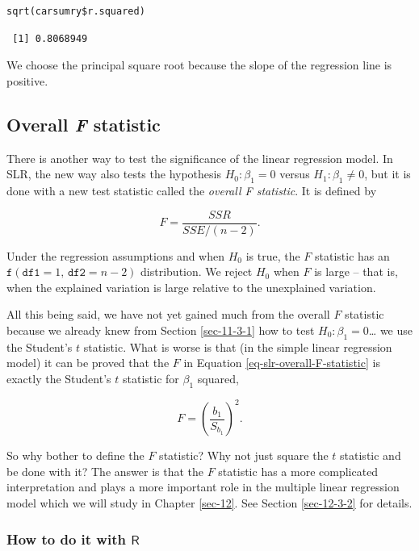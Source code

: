 \documentclass[captions=tableheading]{scrbook}
\begin{document}
\begin{verbatim}
sqrt(carsumry$r.squared)
\end{verbatim}

\begin{verbatim}
 [1] 0.8068949
\end{verbatim}

We choose the principal square root because the slope of the regression line is positive.
\subsection{Overall \emph{F} statistic}
\label{sec-11-3-3}
\label{sub-slr-overall-F-statistic}


There is another way to test the significance of the linear regression model. In SLR, the new way also tests the hypothesis \(H_{0}:\beta_{1}=0\) versus \(H_{1}:\beta_{1}\neq0\), but it is done with a new test statistic called the \emph{overall F statistic}. It is defined by

\begin{equation}
F=\frac{SSR}{SSE/(n-2)}.\label{eq-slr-overall-F-statistic}
\end{equation}

Under the regression assumptions and when \(H_{0}\) is true, the \(F\) statistic has an \(\mathtt{f}(\mathtt{df1}=1,\,\mathtt{df2}=n-2)\) distribution. We reject \(H_{0}\) when \(F\) is large -- that is, when the explained variation is large relative to the unexplained variation.

All this being said, we have not yet gained much from the overall \(F\) statistic because we already knew from Section \ref{sec-11-3-1} how to test \(H_{0}:\beta_{1}=0\)\ldots{} we use the Student's \(t\) statistic. What is worse is that (in the simple linear regression model) it can be proved that the \(F\) in Equation \ref{eq-slr-overall-F-statistic} is exactly the Student's \(t\) statistic for \(\beta_{1}\) squared,

\begin{equation}
F=\left(\frac{b_{1}}{S_{b_{1}}}\right)^{2}.
\end{equation}

So why bother to define the \(F\) statistic? Why not just square the \(t\) statistic and be done with it? The answer is that the \(F\) statistic has a more complicated interpretation and plays a more important role in the multiple linear regression model which we will study in Chapter \ref{sec-12}. See Section \ref{sec-12-3-2} for details.
\subsubsection{How to do it with \(\mathsf{R}\)}
\label{sec-11-3-3-1}
\end{document}
